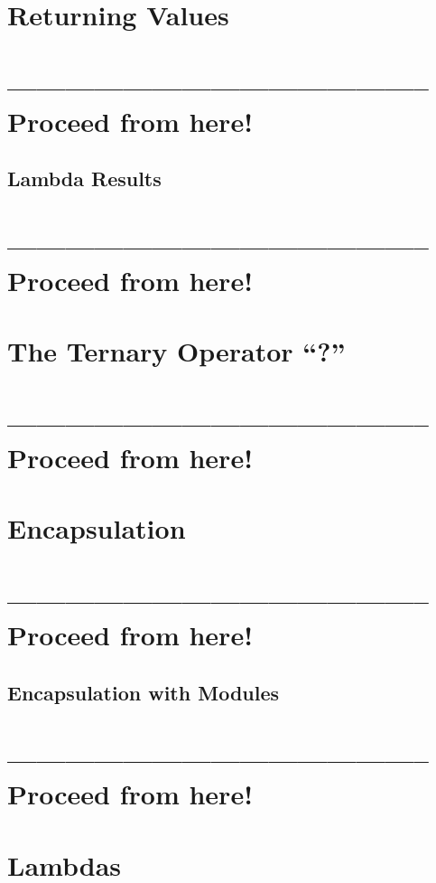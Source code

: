 \documentclass[11pt,a4paper, titlepage, parskip=half, headsepline, footsepline, cleardoublepage=current, headheight=1cm]{scrbook}
\begin{document}
\section{Returning Values}\label{sec:ReturningValues}
\section{-------------------------------------------- Proceed from here!}
\lipsum[5]

\subsection{Lambda Results}\label{sec:LambdaResults}
\section{-------------------------------------------- Proceed from here!}
\lipsum[5]

\section{The Ternary Operator “?”}\label{sec:TheTernaryOperator}
\section{-------------------------------------------- Proceed from here!}
\lipsum[5]

\section{Encapsulation}
\section{-------------------------------------------- Proceed from here!}
\lipsum[5]

\subsection{Encapsulation with Modules}\label{sec:EncapsulationWithModules}
\section{-------------------------------------------- Proceed from here!}
\lipsum[5]

\section{Lambdas}\label{sec:Lambdas}
\end{document}
